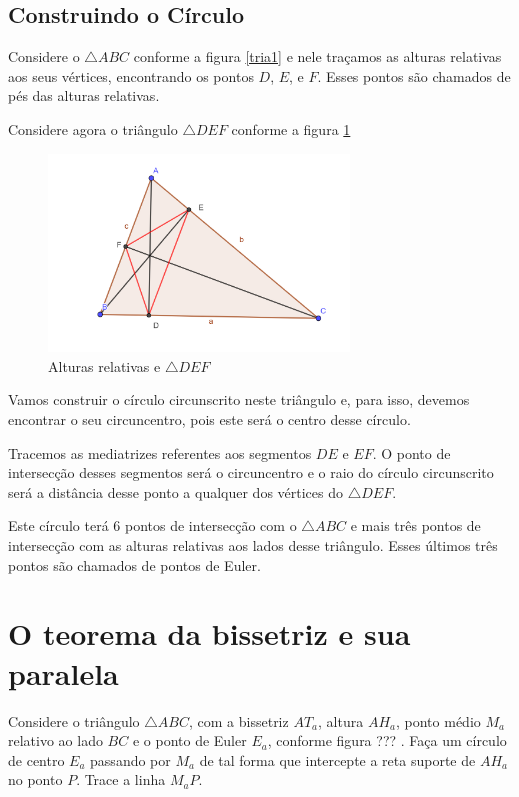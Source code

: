 \documentclass[12pt, openright, a4paper, brazil, openany, oneside]{abntex2}
\begin{document}
\section{Construindo o Círculo}

Considere o $\triangle ABC$ conforme a figura \ref{tria1} e nele traçamos as alturas relativas aos seus vértices, encontrando os pontos $D$, $E$, e $F$. Esses pontos são chamados de pés das alturas relativas.

\newpage

Considere agora o triângulo $\triangle DEF$ conforme a figura \ref{tria2} 

\begin{figure}[h]

    \center

    \includegraphics[width=8cm]{triangulo2.png}
    \caption{Alturas relativas e $\triangle DEF$ \label{tria2}}
    
\end{figure}

Vamos construir o círculo circunscrito neste triângulo e, para isso, devemos encontrar o seu circuncentro, pois este será o centro desse círculo.

Tracemos as mediatrizes referentes aos segmentos $DE$ e $EF$. O ponto de intersecção desses segmentos será o circuncentro e o raio do círculo circunscrito será a distância desse ponto a qualquer dos vértices do $\triangle DEF$.

Este círculo terá 6 pontos de intersecção com o $\triangle ABC$ e mais três pontos de intersecção com as alturas relativas aos lados desse triângulo. Esses últimos três pontos são chamados de pontos de Euler.


\chapter{O teorema da bissetriz e sua paralela}

Considere o triângulo $\triangle ABC$, com a bissetriz $AT_a$, altura $AH_a$, ponto médio $M_a$ relativo ao lado $BC$ e o ponto de Euler $E_a$, conforme figura ??? . Faça um círculo de centro $E_a$ passando por $M_a$ de tal forma que intercepte a reta suporte de $AH_a$ no ponto $P$. Trace a linha $M_{a}P$.
\end{document}

